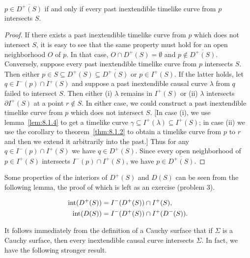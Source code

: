 \begin{proposition}\label{prop:8.3.2}
\(p\in\overline{D^+(S)}\) if and only if every past inextendible timelike curve from
\(p\) intersects \(S\).
\end{proposition}
\begin{proof}
If there exists a past inextendible timelike curve from \(p\) which does not intersect
\(S\), it is easy to see that the same property must hold for an open neighborhood
\(O\) of \(p\). In that case, \(O\cap D^+(S)=\emptyset\) and
\(p\notin\overline{D^+(S)}\). Conversely, suppose every past inextendible timelike
curve from \(p\) intersects \(S\). Then either
\(p\in S\subseteq D^+(S)\subseteq\overline{D^+(S)}\) or \(p\in I^+(S)\). If the
latter holds, let \(q\in I^-(p)\cap I^+(S)\) and suppose a past inextendible causal
curve \(\lambda\) from \(q\) failed to intersect \(S\). Then either (i) \(\lambda\)
remains in \(I^+(S)\) or (ii) \(\lambda\) intersects \(\partial I^+(S)\) at a point
\(r\notin S\). In either case, we could construct a past inextendible timelike curve
from \(p\) which does not intersect \(S\). [In case (i), we use lemma~\ref{lem:8.1.4}
to get a timelike curve \(\gamma\subseteq I^+(\lambda)\subseteq I^+(S)\); in case
(ii) we use the corollary to theorem~\ref{thm:8.1.2} to obtain a timelike curve from
\(p\) to \(r\) and then we extend it arbitrarily into the past.] Thus for any
\(q\in I^-(p)\cap I^+(S)\) we have \(q\in D^+(S)\). Since every open neighborhood
of \(p\in I^+(S)\) intersects \(I^-(p)\cap I^+(S)\), we have
\(p\in\overline{D^+(S)}\).
\end{proof}

Some properties of the interiors of \(D^+(S)\) and \(D(S)\) can be seen from the
following lemma, the proof of which is left as an exercise (problem 3).

\begin{lemma}\label{lem:8.3.3}
\begin{align*}
  \operatorname{int}(D^+(S))&=I^-(D^+(S))\cap I^+(S),\notag\\
  \operatorname{int}(D(S))&=I^-(D^+(S))\cap I^+(D^-(S)).
\end{align*}
\end{lemma}

It follows immediately from the definition of a Cauchy surface that if \(\Sigma\) is
a Cauchy surface, then every inextendible causal curve intersects \(\Sigma\). In fact,
we have the following stronger result.

